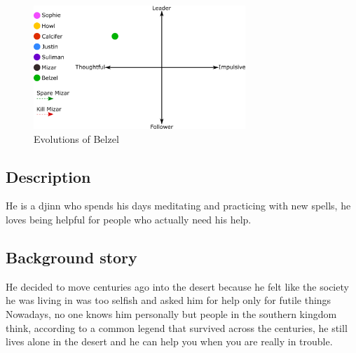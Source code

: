 \begin{figure}
   \centering
    \includegraphics[width=8cm]{Images/Evolutions/belzelEvolution}
   \caption{Evolutions of Belzel}
\end{figure}

\subsection{Description}
He is a djinn who spends his days meditating and practicing with new spells, he loves being helpful for people who actually need his help. 


\subsection{Background story}
He decided to move centuries ago into the desert because he felt like the society he was living in was too selfish and asked him for help only for futile things 
Nowadays, no one knows him personally but people in the southern kingdom think, according to a common legend that survived across the centuries, he still lives alone in the desert and he can help you when you are really in trouble.



